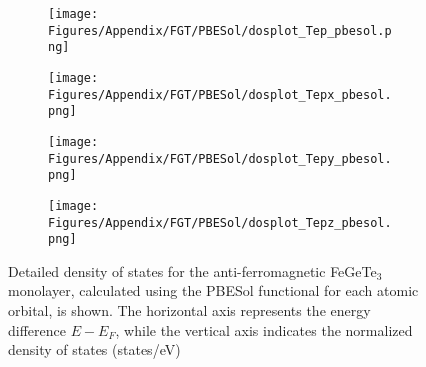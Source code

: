 \begin{figure}[H]
\begin{subfigure}{0.24\textwidth}
\end{subfigure}
\hfill
\begin{subfigure}{0.24\textwidth}
    \texttt{[image: Figures/Appendix/FGT/PBESol/dosplot\_Tep\_pbesol.png]}
    \label{dosplot_FeTep_pbesol}
\end{subfigure}
\hfill
\begin{subfigure}{0.24\textwidth}
    \texttt{[image: Figures/Appendix/FGT/PBESol/dosplot\_Tepx\_pbesol.png]}
    \label{dosplot_FeTepx_pbesol}
\end{subfigure}
\hfill
\begin{subfigure}{0.24\textwidth}
    \texttt{[image: Figures/Appendix/FGT/PBESol/dosplot\_Tepy\_pbesol.png]}
    \label{dosplot_FeTepy_pbesol}
\end{subfigure}
\begin{subfigure}{0.24\textwidth}
    \texttt{[image: Figures/Appendix/FGT/PBESol/dosplot\_Tepz\_pbesol.png]}
    \label{dosplot_FeTepz_pbesol}
\end{subfigure}
\hfill
\caption{Detailed density of states for the anti-ferromagnetic FeGeTe$_3$ monolayer, calculated using the PBESol functional for each atomic orbital, is shown. The horizontal axis represents the energy difference $E - E_F$, while the vertical axis indicates the normalized density of states (states/eV)}
\label{Fepbesol}
\end{figure}
\newpage
